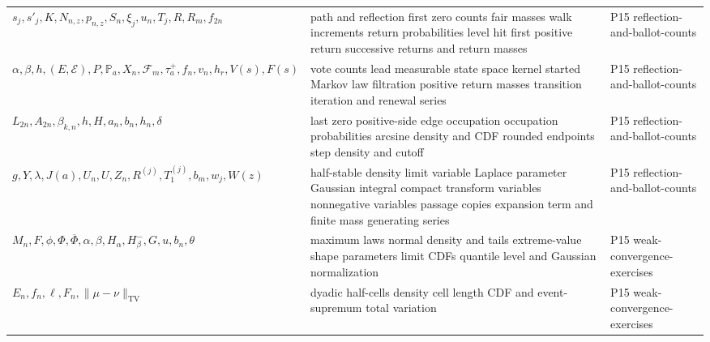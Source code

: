 \begin{longtable}{@{}p{}p{}p{}@{}}
\(s_j,\allowbreak s'_j,\allowbreak K,\allowbreak N_{n,z},\allowbreak p_{n,z},\allowbreak S_n,\allowbreak \xi_j,\allowbreak u_n,\allowbreak T_j,\allowbreak R,\allowbreak R_m,\allowbreak f_{2n}\) & path and reflection first zero counts fair masses walk increments return probabilities level hit first positive return successive returns and return masses & P15 reflection-\allowbreak{}and-\allowbreak{}ballot-\allowbreak{}counts \\
\(\alpha,\allowbreak \beta,\allowbreak h,\allowbreak (E,\allowbreak \mathcal E),\allowbreak P,\allowbreak \mathbb P_a,\allowbreak X_n,\allowbreak \mathcal F_m,\allowbreak \tau_a^+,\allowbreak f_n,\allowbreak v_n,\allowbreak h_r,\allowbreak V(s),\allowbreak F(s)\) & vote counts lead measurable state space kernel started Markov law filtration positive return masses transition iteration and renewal series & P15 reflection-\allowbreak{}and-\allowbreak{}ballot-\allowbreak{}counts \\
\(L_{2n},\allowbreak A_{2n},\allowbreak \beta_{k,n},\allowbreak h,\allowbreak H,\allowbreak a_n,\allowbreak b_n,\allowbreak h_n,\allowbreak \delta\) & last zero positive-side edge occupation occupation probabilities arcsine density and CDF rounded endpoints step density and cutoff & P15 reflection-\allowbreak{}and-\allowbreak{}ballot-\allowbreak{}counts \\
\(g,\allowbreak Y,\allowbreak \lambda,\allowbreak J(a),\allowbreak U_n,\allowbreak U,\allowbreak Z_n,\allowbreak R^{(j)},\allowbreak T_1^{(j)},\allowbreak b_m,\allowbreak w_j,\allowbreak W(z)\) & half-stable density limit variable Laplace parameter Gaussian integral compact transform variables nonnegative variables passage copies expansion term and finite mass generating series & P15 reflection-\allowbreak{}and-\allowbreak{}ballot-\allowbreak{}counts \\
\(M_n,\allowbreak F,\allowbreak \phi,\allowbreak \Phi,\allowbreak \overline\Phi,\allowbreak \alpha,\allowbreak \beta,\allowbreak H_\alpha,\allowbreak H_\beta^-,\allowbreak G,\allowbreak u,\allowbreak b_n,\allowbreak \theta\) & maximum laws normal density and tails extreme-value shape parameters limit CDFs quantile level and Gaussian normalization & P15 weak-\allowbreak{}convergence-\allowbreak{}exercises \\
\(E_n,\allowbreak f_n,\allowbreak \ell,\allowbreak F_n,\allowbreak \|\mu-\nu\|_{\mathrm{TV}}\) & dyadic half-cells density cell length CDF and event-supremum total variation & P15 weak-\allowbreak{}convergence-\allowbreak{}exercises \\

\end{longtable}
